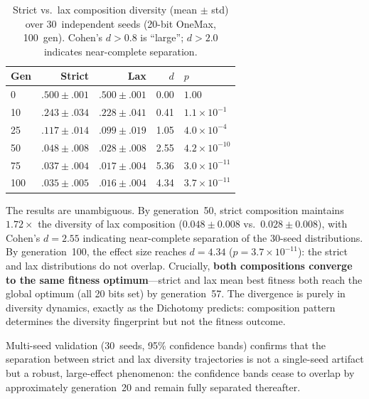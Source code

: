 \documentclass[sigconf,anonymous]{acmart}
\begin{document}
\begin{table}[ht]
\centering
\caption{Strict vs.\ lax composition diversity (mean $\pm$ std) over 30~independent seeds (20-bit OneMax, 100~gen). Cohen's $d > 0.8$ is ``large''; $d > 2.0$ indicates near-complete separation.}
\label{tab:multiseed}
\small
\begin{tabular}{@{}lrrrl@{}}
\toprule
\textbf{Gen} & \textbf{Strict} & \textbf{Lax} & \textbf{$d$} & \textbf{$p$} \\
\midrule
0   & $.500 \pm .001$ & $.500 \pm .001$ & 0.00 & $1.00$ \\
10  & $.243 \pm .034$ & $.228 \pm .041$ & 0.41 & $1.1{\times}10^{-1}$ \\
25  & $.117 \pm .014$ & $.099 \pm .019$ & 1.05 & $4.0{\times}10^{-4}$ \\
50  & $.048 \pm .008$ & $.028 \pm .008$ & 2.55 & $4.2{\times}10^{-10}$ \\
75  & $.037 \pm .004$ & $.017 \pm .004$ & 5.36 & $3.0{\times}10^{-11}$ \\
100 & $.035 \pm .005$ & $.016 \pm .004$ & 4.34 & $3.7{\times}10^{-11}$ \\
\bottomrule
\end{tabular}
\end{table}

The results are unambiguous. By generation~50, strict composition maintains $1.72\times$ the diversity of lax composition ($0.048 \pm 0.008$ vs.\ $0.028 \pm 0.008$), with Cohen's $d = 2.55$ indicating near-complete separation of the 30-seed distributions. By generation~100, the effect size reaches $d = 4.34$ ($p = 3.7 \times 10^{-11}$): the strict and lax distributions do not overlap. Crucially, \textbf{both compositions converge to the same fitness optimum}---strict and lax mean best fitness both reach the global optimum (all 20 bits set) by generation~57. The divergence is purely in diversity dynamics, exactly as the Dichotomy predicts: composition pattern determines the diversity fingerprint but not the fitness outcome.

Multi-seed validation (30~seeds, 95\% confidence bands) confirms that the separation between strict and lax diversity trajectories is not a single-seed artifact but a robust, large-effect phenomenon: the confidence bands cease to overlap by approximately generation~20 and remain fully separated thereafter.
\end{document}

